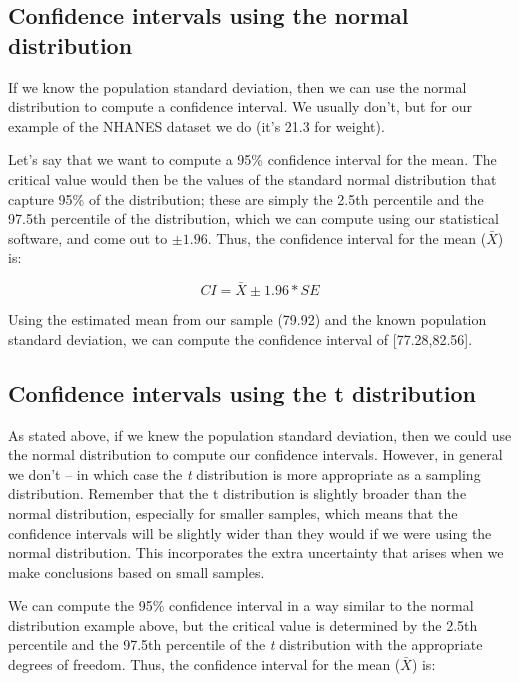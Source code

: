 \documentclass[12pt,]{book}
\theoremstyle{definition}
\theoremstyle{definition}
\theoremstyle{definition}
\theoremstyle{remark}
\begin{document}
\hypertarget{confidence-intervals-using-the-normal-distribution}{%
\subsection{Confidence intervals using the normal distribution}\label{confidence-intervals-using-the-normal-distribution}}

If we know the population standard deviation, then we can use the normal distribution to compute a confidence interval. We usually don't, but for our example of the NHANES dataset we do (it's 21.3 for weight).

Let's say that we want to compute a 95\% confidence interval for the mean. The critical value would then be the values of the standard normal distribution that capture 95\% of the distribution; these are simply the 2.5th percentile and the 97.5th percentile of the distribution, which we can compute using our statistical software, and come out to \(\pm 1.96\). Thus, the confidence interval for the mean (\(\bar{X}\)) is:

\[
CI = \bar{X} \pm 1.96*SE
\]

Using the estimated mean from our sample (79.92) and the known population standard deviation, we can compute the confidence interval of {[}77.28,82.56{]}.

\hypertarget{confidence-intervals-using-the-t-distribution}{%
\subsection{Confidence intervals using the t distribution}\label{confidence-intervals-using-the-t-distribution}}

As stated above, if we knew the population standard deviation, then we could use the normal distribution to compute our confidence intervals. However, in general we don't -- in which case the \emph{t} distribution is more appropriate as a sampling distribution. Remember that the t distribution is slightly broader than the normal distribution, especially for smaller samples, which means that the confidence intervals will be slightly wider than they would if we were using the normal distribution. This incorporates the extra uncertainty that arises when we make conclusions based on small samples.

We can compute the 95\% confidence interval in a way similar to the normal distribution example above, but the critical value is determined by the 2.5th percentile and the 97.5th percentile of the \emph{t} distribution with the appropriate degrees of freedom. Thus, the confidence interval for the mean (\(\bar{X}\)) is:
\end{document}
